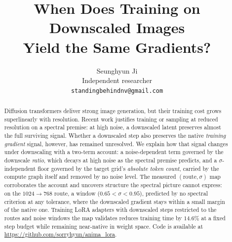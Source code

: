 \documentclass{article} %
\title{When Does Training on Downscaled Images\\
Yield the Same Gradients?}
\author{Seunghyun Ji\\
Independent researcher\\
\texttt{standingbehindnv@gmail.com}
}
\begin{document}
\maketitle
\fancyhead{}
\renewcommand{\headrulewidth}{0.4pt}

\begin{abstract}
Diffusion transformers deliver strong image generation, but their
training cost grows superlinearly with resolution. Recent work
justifies training or sampling at reduced resolution on a spectral
premise: at high noise, a downscaled latent preserves almost the full
surviving signal. Whether a downscaled step also preserves the native
\emph{training gradient} signal, however, has remained unresolved. We
explain how that signal changes under downscaling with a two-term
account: a noise-dependent term governed by the downscale
\emph{ratio}, which decays at high noise as the spectral premise
predicts, and a $\sigma$-independent floor governed by the target
grid's \emph{absolute token count}, carried by the compute graph
itself and removed by no noise level. The measured
$(\text{route},\sigma)$ map corroborates the account and uncovers
structure the spectral picture cannot express: on the $1024{\to}768$
route, a window ($0.65<\sigma<0.95$), predicted by no spectral
criterion at any tolerance, where the downscaled gradient stays
within a small margin of the native one. Training LoRA adapters with
downscaled steps restricted to the routes and noise windows the map
validates reduces training time by $14.6\%$ at a fixed step
budget while remaining near-native in weight space. Code is available at
\url{https://github.com/sorryhyun/anima_lora}.
\end{abstract}






\clearpage

\end{document}
